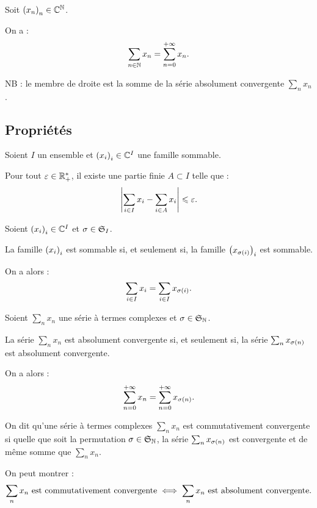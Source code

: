 \begin{ex}
Soit \(\paren{x_n}_n\in\C^\N\).

On a : \[\sum_{n\in\N}x_n=\sum_{n=0}^{\pinf}x_n.\]

NB : le membre de droite est la somme de la série absolument convergente \(\sum_nx_n\).
\end{ex}

\subsection{Propriétés}

\begin{prop}
Soient \(I\) un ensemble et \(\paren{x_i}_i\in\C^I\) une famille sommable.

Pour tout \(\epsilon\in\Rps\), il existe une partie finie \(A\subset I\) telle que : \[\abs{\sum_{i\in I}x_i-\sum_{i\in A}x_i}\leq\epsilon.\]
\end{prop}

\begin{dem}
\end{dem}

\begin{prop}
Soient \(\paren{x_i}_i\in\C^I\) et \(\sigma\in\S{I}\).

La famille \(\paren{x_i}_i\) est sommable si, et seulement si, la famille \(\paren{x_{\sigma\paren{i}}}_i\) est sommable.

On a alors : \[\sum_{i\in I}x_i=\sum_{i\in I}x_{\sigma\paren{i}}.\]
\end{prop}

\begin{cor}
Soient \(\sum_nx_n\) une série à termes complexes et \(\sigma\in\S{\N}\).

La série \(\sum_nx_n\) est absolument convergente si, et seulement si, la série \(\sum_nx_{\sigma\paren{n}}\) est absolument convergente.

On a alors : \[\sum_{n=0}^{\pinf}x_n=\sum_{n=0}^{\pinf}x_{\sigma\paren{n}}.\]
\end{cor}

\begin{rem}
On dit qu'une série à termes complexes \(\sum_nx_n\) est commutativement convergente si quelle que soit la permutation \(\sigma\in\S{\N}\), la série \(\sum_nx_{\sigma\paren{n}}\) est convergente et de même somme que \(\sum_nx_n\).

On peut montrer : \[\sum_nx_n\text{ est commutativement convergente}\ssi\sum_nx_n\text{ est absolument convergente}.\]
\end{rem}

